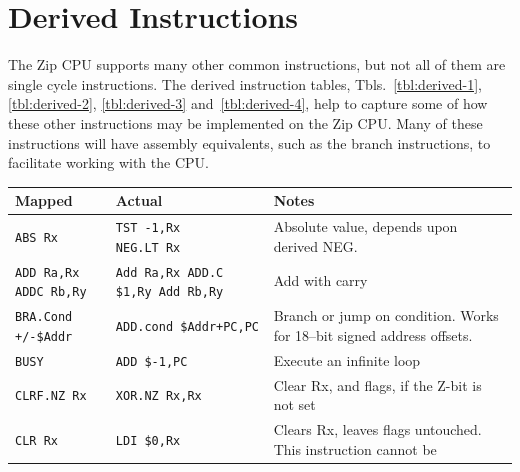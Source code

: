 \documentclass{gqtekspec}
\begin{document}
\section{Derived Instructions}
The Zip CPU supports many other common instructions, but not all of them
are single cycle instructions.  The derived instruction tables,
Tbls.~\ref{tbl:derived-1}, \ref{tbl:derived-2}, \ref{tbl:derived-3} 
and~\ref{tbl:derived-4},
help to capture some of how these other instructions may be implemented on
the Zip CPU.  Many of these instructions will have assembly equivalents,
such as the branch instructions, to facilitate working with the CPU.
\begin{table}\begin{center}
\begin{tabular}{p{1.4in}p{1.5in}p{3in}}\\\hline
Mapped & Actual  & Notes \\\hline
{\tt ABS Rx}
	& \parbox[t]{1.5in}{\tt TST -1,Rx\\NEG.LT Rx}
	& Absolute value, depends upon derived NEG.\\\hline
\parbox[t]{1.4in}{\tt ADD Ra,Rx\\ADDC Rb,Ry}
	& \parbox[t]{1.5in}{\tt Add Ra,Rx\\ADD.C \$1,Ry\\Add Rb,Ry}
	& Add with carry \\\hline
{\tt BRA.Cond +/-\$Addr}
	& \hbox{\tt ADD.cond \$Addr+PC,PC}
	& Branch or jump on condition.  Works for 18--bit
		signed address offsets.\\\hline
{\tt BUSY } & {\tt ADD \$-1,PC} & Execute an infinite loop \\\hline
{\tt CLRF.NZ Rx }
	& {\tt XOR.NZ Rx,Rx}
	& Clear Rx, and flags, if the Z-bit is not set \\\hline
{\tt CLR Rx }
	& {\tt LDI \$0,Rx}
	& Clears Rx, leaves flags untouched.  This instruction cannot be

\end{tabular}
\end{center}
\end{table}
\end{document}
